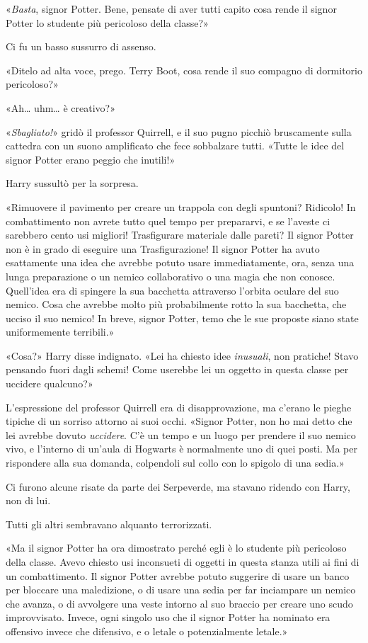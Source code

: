 «\textit{Basta}, signor Potter. Bene, pensate di aver tutti capito cosa rende il signor Potter lo studente più pericoloso della classe?»

Ci fu un basso sussurro di assenso.

«Ditelo ad alta voce, prego. Terry Boot, cosa rende il suo compagno di dormitorio pericoloso?»

«Ah… uhm… è creativo?»

«\textit{Sbagliato!}» gridò il professor Quirrell, e il suo pugno picchiò bruscamente sulla cattedra con un suono amplificato che fece sobbalzare tutti. «Tutte le idee del signor Potter erano peggio che inutili!»

Harry sussultò per la sorpresa.

«Rimuovere il pavimento per creare un trappola con degli spuntoni? Ridicolo! In combattimento non avrete tutto quel tempo per prepararvi, e se l’aveste ci sarebbero cento usi migliori! Trasfigurare materiale dalle pareti? Il signor Potter non è in grado di eseguire una Trasfigurazione! Il signor Potter ha avuto esattamente una idea che avrebbe potuto usare immediatamente, ora, senza una lunga preparazione o un nemico collaborativo o una magia che non conosce. Quell’idea era di spingere la sua bacchetta attraverso l’orbita oculare del suo nemico. Cosa che avrebbe molto più probabilmente rotto la sua bacchetta, che ucciso il suo nemico! In breve, signor Potter, temo che le sue proposte siano state uniformemente terribili.»

«Cosa?» Harry disse indignato. «Lei ha chiesto idee \textit{inusuali}, non pratiche! Stavo pensando fuori dagli schemi! Come userebbe lei un oggetto in questa classe per uccidere qualcuno?»

L’espressione del professor Quirrell era di disapprovazione, ma c’erano le pieghe tipiche di un sorriso attorno ai suoi occhi. «Signor Potter, non ho mai detto che lei avrebbe dovuto \textit{uccidere}. C’è un tempo e un luogo per prendere il suo nemico vivo, e l’interno di un’aula di Hogwarts è normalmente uno di quei posti. Ma per rispondere alla sua domanda, colpendoli sul collo con lo spigolo di una sedia.»

Ci furono alcune risate da parte dei Serpeverde, ma stavano ridendo con Harry, non di lui.

Tutti gli altri sembravano alquanto terrorizzati.

«Ma il signor Potter ha ora dimostrato perché egli è lo studente più pericoloso della classe. Avevo chiesto usi inconsueti di oggetti in questa stanza utili ai fini di un combattimento. Il signor Potter avrebbe potuto suggerire di usare un banco per bloccare una maledizione, o di usare una sedia per far inciampare un nemico che avanza, o di avvolgere una veste intorno al suo braccio per creare uno scudo improvvisato. Invece, ogni singolo uso che il signor Potter ha nominato era offensivo invece che difensivo, e o letale o potenzialmente letale.»

